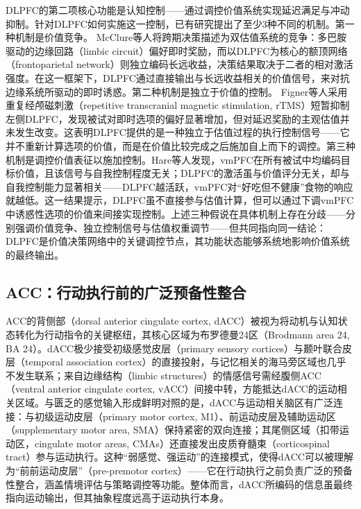 DLPFC的第二项核心功能是认知控制——通过调控价值系统实现延迟满足与冲动抑制。针对DLPFC如何实施这一控制，已有研究提出了至少3种不同的机制。第一种机制是价值竞争。 McClure等人将跨期决策描述为双估值系统的竞争：多巴胺驱动的边缘回路（limbic circuit）偏好即时奖励，而以DLPFC为核心的额顶网络（frontoparietal network）则独立编码长远收益，决策结果取决于二者的相对激活强度\cite{mcclure2004separate}。在这一框架下，DLPFC通过直接输出与长远收益相关的价值信号，来对抗边缘系统所驱动的即时诱惑。第二种机制是独立于价值的控制。 Figner等人采用重复经颅磁刺激（repetitive transcranial magnetic stimulation, rTMS）短暂抑制左侧DLPFC，发现被试对即时选项的偏好显著增加，但对延迟奖励的主观估值并未发生改变\cite{figner2010lateral}。这表明DLPFC提供的是一种独立于估值过程的执行控制信号——它并不重新计算选项的价值，而是在价值比较完成之后施加自上而下的调控。第三种机制是调控价值表征以施加控制。Hare等人发现，vmPFC在所有被试中均编码目标价值，且该信号与自我控制程度无关；DLPFC的激活虽与价值评分无关，却与自我控制能力显著相关——DLPFC越活跃，vmPFC对“好吃但不健康”食物的响应就越低\cite{hare2009control}。这一结果提示，DLPFC虽不直接参与估值计算，但可以通过下调vmPFC中诱惑性选项的价值来间接实现控制。上述三种假说在具体机制上存在分歧——分别强调价值竞争、独立控制信号与估值权重调节——但共同指向同一结论：DLPFC是价值决策网络中的关键调控节点，其功能状态能够系统地影响价值系统的最终输出。

\subsection{ACC：行动执行前的广泛预备性整合}\label{chap1:ACC}
ACC的背侧部（dorsal anterior cingulate cortex, dACC）被视为将动机与认知状态转化为行动指令的关键枢纽，其核心区域为布罗德曼24区\cite{paus2001primate}（Brodmann area 24, BA 24）。dACC极少接受初级感觉皮层（primary sensory cortices）与颞叶联合皮层（temporal association cortex）的直接投射，与记忆相关的海马旁区域也几乎不发生联系\cite{heilbronner2016dorsal}；来自边缘结构（limbic structures）的情感信号需经腹侧ACC（ventral anterior cingulate cortex, vACC）间接中转，方能抵达dACC的运动相关区域\cite{paus2001primate}。与匮乏的感觉输入形成鲜明对照的是，dACC与运动相关脑区有广泛连接：与初级运动皮层（primary motor cortex, M1）、前运动皮层及辅助运动区（supplementary motor area, SMA）保持紧密的双向连接；其尾侧区域（扣带运动区，cingulate motor areas, CMAs）还直接发出皮质脊髓束（corticospinal tract）参与运动执行\cite{devinsky1995contributions, paus2001primate}。这种“弱感觉、强运动”的连接模式，使得dACC可以被理解为“前前运动皮层”（pre-premotor cortex）——它在行动执行之前负责广泛的预备性整合，涵盖情境评估与策略调控等功能\cite{heilbronner2016dorsal}。整体而言，dACC所编码的信息虽最终指向运动输出，但其抽象程度远高于运动执行本身。

